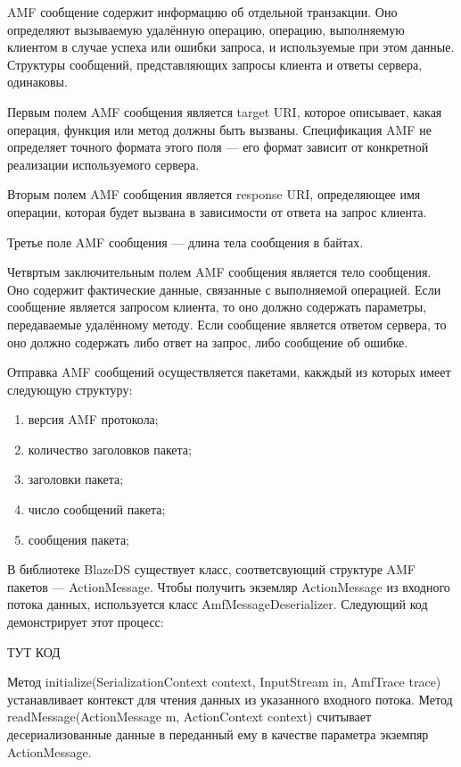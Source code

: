 AMF сообщение содержит информацию об отдельной транзакции. Оно определяют вызываемую удалённую операцию, 
операцию, выполняемую клиентом в случае успеха или ошибки запроса, и используемые при этом данные. Структуры сообщений,
 представляющих запросы клиента и ответы сервера, одинаковы.
 
Первым полем AMF сообщения является target URI, которое описывает, какая операция, функция или 
метод должны быть вызваны. Спецификация AMF не определяет точного формата этого поля --- его формат зависит 
от конкретной реализации используемого сервера.

Вторым полем AMF сообщения является response URI, определяющее имя операции, которая будет вызвана в зависимости от 
ответа на запрос клиента.

Третье поле AMF сообщения --- длина тела сообщения в байтах.

Четвртым заключительным полем AMF сообщения является тело сообщения. Оно содержит фактические данные, связанные 
с выполняемой операцией. Если сообщение является запросом клиента, то оно должно содержать параметры, передаваемые 
удалённому методу. Если сообщение является ответом сервера, то оно должно содержать либо ответ на запрос, либо 
сообщение об ошибке.

Отправка AMF сообщений осуществляется пакетами, какждый из которых имеет следующую структуру:

\begin{enumerate}
\item версия AMF протокола;
\item количество заголовков пакета;
\item заголовки пакета;
\item число сообщений пакета;
\item сообщения пакета;
\end{enumerate}

В библиотеке BlazeDS существует класс, соответсвующий структуре AMF пакетов --- ActionMessage. Чтобы получить экземляр 
ActionMessage из входного потока данных, используется класс AmfMessageDeserializer. Следующий код демонстрирует 
этот процесс:

ТУТ КОД
 
Метод initialize(SerializationContext context, InputStream in, AmfTrace trace) устанавливает контекст для чтения данных из 
указанного входного потока. Метод readMessage(ActionMessage m, ActionContext context) считывает десериализованные данные в 
переданный ему в качестве параметра экземпяр ActionMessage.

